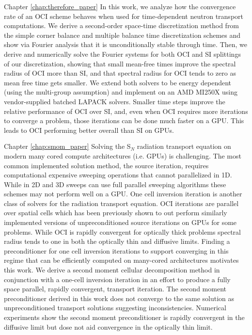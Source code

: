 Chapter \ref{chap:therefore_paper}
In this work, we analyze how the convergence rate of an OCI scheme behaves when used for time-dependent neutron transport computations.
We derive a second-order space-time discretization method from the simple corner balance and multiple balance time discretization schemes and show via Fourier analysis that it is unconditionally stable through time.
Then, we derive and numerically solve the Fourier systems for both OCI and SI splittings of our discretization, showing that small mean-free times improve the spectral radius of OCI more than SI, and that spectral radius for OCI tends to zero as mean free time gets smaller.
We extend both solvers to be energy dependent (using the multi-group assumption) and implement on an AMD MI250X using vendor-supplied batched LAPACK solvers.
Smaller time steps improve the relative performance of OCI over SI, and, even when OCI requires more iterations to converge a problem, those iterations can be done much faster on a GPU.
This leads to OCI performing better overall than SI on GPUs.


Chapter \ref{chap:smom_paper}
Solving the S$_N$ radiation transport equation on modern many cored compute architectures (i.e. GPUs) is challenging.
The most common implemented solution method, the source iteration, requires computational expensive sweeping operations that cannot parallelized in 1D.
While in 2D and 3D sweeps can use full parallel sweeping algorithms these schemes may not perform well on a GPU.
One cell inversion iteration is another class of solvers for the radiation transport equation.
OCI iterations are parallel over spatial cells which has been previously shown to out perform similarly implemented versions of unpreconditioned source iterations on GPUs for some problems.
While OCI is rapidly convergent for optically thick problems spectral radius tends to one in both the optically thin and diffusive limits.
Finding a preconditioner for one cell inversion iterations to support converging in this regime that can be efficiently computed on many-cored architectures motivates this work.
We derive a second moment cellular decomposition method in conjunction with a one-cell inversion iteration in an effort to produce a fully space parallel, rapidly convergent, transport iteration.
The second moment preconditioner derived in this work does not converge to the same solution as unpreconditioned transport solutions suggesting inconsistencies.
Numerical experiments show the second moment preconditioner is rapidly convergent in the diffusive limit but dose not aid convergence in the optically thin limit.



